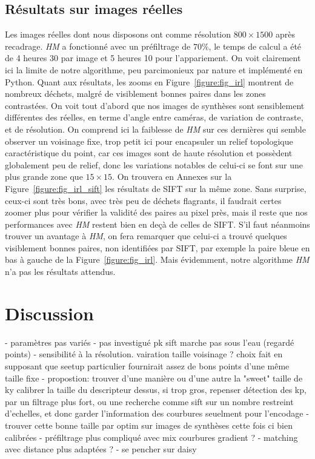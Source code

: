 \documentclass[
	a4paper, %
	10pt, %
	unnumberedsections, %
	twoside, %
]{LTJournalArticle}
\begin{document}
\subsection{Résultats sur images réelles}
Les images réelles dont nous disposons ont comme résolution $800 \times 1500$ après recadrage. \textit{HM} a fonctionné
avec un préfiltrage de $70 \%$, le temps de calcul a été de 4 heures 30 par image et 5 heures 10 pour l'appariement.
On voit clairement ici la limite de notre algorithme, peu parcimonieux par nature et implémenté en Python.
Quant aux résultats, les zooms en Figure~\ref{figure:fig_irl} montrent de nombreux déchets, malgré de visiblement
bonnes paires dans les zones contrastées.
On voit tout d'abord que nos images de synthèses sont sensiblement différentes des réelles,
en terme d'angle entre caméras, de variation de contraste, et de résolution.
On comprend ici la faiblesse de \textit{HM} sur ces dernières qui semble observer un voisinage fixe,
trop petit ici pour encapsuler un relief topologique caractéristique du point,
car ces images sont de haute résolution et possèdent globalement peu de relief, donc les
variations notables de celui-ci se font sur une plus grande zone que $15 \times 15$.
On trouvera en Annexes sur la Figure~\ref{figure:fig_irl_sift} les résultats de SIFT sur la même zone.
Sans surprise, ceux-ci sont très bons, avec très peu de déchets flagrants, il faudrait certes zoomer plus
pour vérifier la validité des paires au pixel près, mais il reste que nos performances avec \textit{HM}
restent bien en deçà de celles de SIFT. S'il faut néanmoins trouver un avantage à \textit{HM}, on fera
remarquer que celui-ci a trouvé quelques visiblement bonnes paires, non identifiées par SIFT, par
exemple la paire bleue en bas à gauche de la Figure~\ref{figure:fig_irl}.
Mais évidemment, notre algorithme \textit{HM} n'a pas les résultats attendus.


\clearpage

\section{Discussion}

- paramètres pas variés
- pas investigué pk sift marche pas sous l'eau (regardé points)
- sensibilité à la résolution. vairation taille voisinage ? choix fait
en supposant que seetup particulier fournirait assez de bons points d'une
même taille fixe
- propostion: trouver d'une manière ou d'une autre la "sweet" taille de ky
calibrer la taille du descripteur dessus, si trop gros, repenser détection des
kp, par un filtrage plus fort, ou une recherche comme sift sur un nombre
restreint d'echelles, et donc garder l'information des courbures seuelment
pour l'encodage
- trouver cette bonne taille par optim sur images de synthèses cette fois ci
bien calibrées
- préfiltrage plus compliqué avec mix courbures gradient ?
- matching avec distance plus adaptées ?
- se pencher sur daisy
\end{document}
